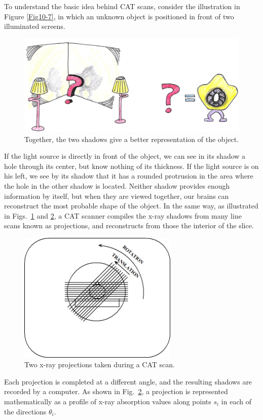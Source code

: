 To understand the basic idea behind CAT scans, consider the illustration in Figure \ref{Fig10-7}, in which an unknown object is positioned in front of two illuminated screens.  
\begin{figure}[!htb]
	\centering
	\includegraphics[width=\textwidth]{./figures/Topic10/Fig10-8.jpg}
	\caption{Together, the two shadows give a better representation of the object.}
	\label{Fig10-8}
\end{figure}
If the light source is directly in front of the object, we can see in its shadow a hole through its center, but know nothing of its thickness.  If the light source is on his left, we see by its shadow that it has a rounded protrusion in the area where the hole in the other shadow is located.  Neither shadow provides enough information by itself, but when they are viewed together, our brains can reconstruct the most probable shape of the object.  In the same way, as illustrated in Figs.~\ref{Fig10-8} and \ref{Fig10-9}, a CAT scanner compiles the x-ray shadows from many line scans known as projections, and reconstructs from those the interior of the slice.  
\begin{figure}[!htb]
	\centering
	\includegraphics[width=3.0in]{./figures/Topic10/Fig10-9.png}
	\caption{Two x-ray projections taken during a CAT scan.}
	\label{Fig10-9}
\end{figure}
Each projection is completed at a different angle, and the resulting shadows are recorded by a computer.  As shown in Fig.~\ref{Fig10-9}, a projection is represented mathematically as a profile of x-ray absorption values along points $s_i$ in each of the directions $\theta_i$.

